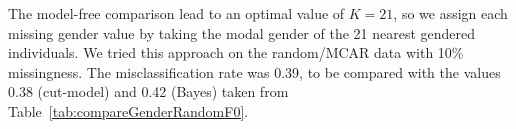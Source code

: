 \documentclass{article}
\begin{document}
%
%

The model-free comparison lead to an optimal value of $K=21$, so we assign each missing gender value by taking the modal gender of the 21 nearest gendered individuals. We tried this approach on the random/MCAR data with 10\% missingness. The misclassification rate was 0.39, to be compared with the values 0.38 (cut-model) and 0.42 (Bayes) taken from Table~\ref{tab:compareGenderRandomF0}. 
\end{document}
